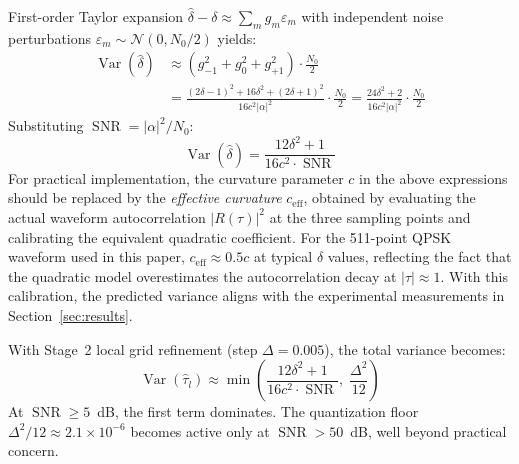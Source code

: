 \documentclass[a4paper,fleqn]{cas-dc}
\DeclareMathOperator{\Var}{Var}
\DeclareMathOperator{\SNR}{SNR}
\newcommand{\Nc}{\mathcal{N}}
\newtheorem{theorem}{Theorem}
\newtheorem{lemma}[theorem]{Lemma}
\begin{document}
First-order Taylor expansion $\hat{\delta} - \delta \approx \sum_m g_m \varepsilon_m$ with independent noise perturbations $\varepsilon_m \sim \Nc(0, N_0/2)$ yields:
\begin{align}
\Var(\hat{\delta}) &\approx (g_{-1}^2 + g_0^2 + g_{+1}^2) \cdot \frac{N_0}{2} \nonumber\\
&= \frac{(2\delta-1)^2 + 16\delta^2 + (2\delta+1)^2}{16c^2|\alpha|^2} \cdot \frac{N_0}{2}
   = \frac{24\delta^2 + 2}{16c^2|\alpha|^2} \cdot \frac{N_0}{2}
\label{eq:A6}
\end{align}
Substituting $\SNR = |\alpha|^2/N_0$:
\begin{equation}
\Var(\hat{\delta}) = \frac{12\delta^2 + 1}{16c^2 \cdot \SNR}
\label{eq:A7}
\end{equation}
For practical implementation, the curvature parameter $c$ in the above expressions should be replaced by the \emph{effective curvature} $c_{\text{eff}}$, obtained by evaluating the actual waveform autocorrelation $|R(\tau)|^2$ at the three sampling points and calibrating the equivalent quadratic coefficient. For the 511-point QPSK waveform used in this paper, $c_{\text{eff}} \approx 0.5c$ at typical $\delta$ values, reflecting the fact that the quadratic model overestimates the autocorrelation decay at $|\tau|\approx 1$. With this calibration, the predicted variance aligns with the experimental measurements in Section~\ref{sec:results}.

With Stage~2 local grid refinement (step $\Delta = 0.005$), the total variance becomes:
\begin{equation}
\Var(\hat{\tau}_l) \approx \min\!\left( \frac{12\delta^2 + 1}{16c^2 \cdot \SNR}, \; \frac{\Delta^2}{12} \right)
\label{eq:A9}
\end{equation}
At $\SNR \ge 5$~dB, the first term dominates. The quantization floor $\Delta^2/12 \approx 2.1 \times 10^{-6}$ becomes active only at $\SNR > 50$~dB, well beyond practical concern.









\printcredits

%





\end{document}
